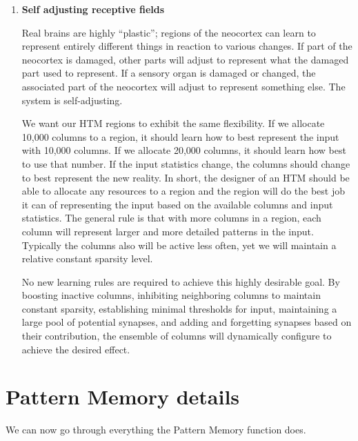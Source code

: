 \begin{enumerate}
\item {\bf Self adjusting receptive fields}

Real brains are highly ``plastic''; regions of the neocortex can learn
to represent entirely different things in reaction to various
changes. If part of the neocortex is damaged, other parts will adjust
to represent what the damaged part used to represent. If a sensory
organ is damaged or changed, the associated part of the neocortex will
adjust to represent something else. The system is self-adjusting.

We want our HTM regions to exhibit the same flexibility. If we
allocate 10,000 columns to a region, it should learn how to best
represent the input with 10,000 columns. If we allocate 20,000
columns, it should learn how best to use that number. If the input
statistics change, the columns should change to best represent the new
reality. In short, the designer of an HTM should be able to allocate
any resources to a region and the region will do the best job it can
of representing the input based on the available columns and input
statistics. The general rule is that with more columns in a region,
each column will represent larger and more detailed patterns in the
input. Typically the columns also will be active less often, yet we
will maintain a relative constant sparsity level.

No new learning rules are required to achieve this highly desirable
goal. By boosting inactive columns, inhibiting neighboring columns to
maintain constant sparsity, establishing minimal thresholds for input,
maintaining a large pool of potential synapses, and adding and
forgetting synapses based on their contribution, the ensemble of
columns will dynamically configure to achieve the desired effect.
\end{enumerate}

\section*{Pattern Memory details}

We can now go through everything the Pattern Memory function does.

